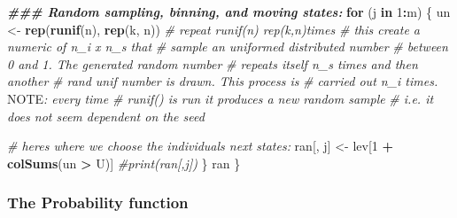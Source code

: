 \documentclass[
]{article}
\newenvironment{Shaded}{\begin{snugshade}}{\end{snugshade}}
\newcommand{\AlertTok}[1]{\textcolor[rgb]{0.94,0.16,0.16}{#1}}
\newcommand{\CommentTok}[1]{\textcolor[rgb]{0.56,0.35,0.01}{\textit{#1}}}
\newcommand{\ControlFlowTok}[1]{\textcolor[rgb]{0.13,0.29,0.53}{\textbf{#1}}}
\newcommand{\DecValTok}[1]{\textcolor[rgb]{0.00,0.00,0.81}{#1}}
\newcommand{\DocumentationTok}[1]{\textcolor[rgb]{0.56,0.35,0.01}{\textbf{\textit{#1}}}}
\newcommand{\FunctionTok}[1]{\textcolor[rgb]{0.13,0.29,0.53}{\textbf{#1}}}
\newcommand{\NormalTok}[1]{#1}
\newcommand{\OtherTok}[1]{\textcolor[rgb]{0.56,0.35,0.01}{#1}}
\newcommand{\SpecialCharTok}[1]{\textcolor[rgb]{0.81,0.36,0.00}{\textbf{#1}}}
\begin{document}
\begin{Shaded}
\begin{Highlighting}[]
  \DocumentationTok{\#\#\# Random sampling, binning, and moving states: }
  \ControlFlowTok{for}\NormalTok{ (j }\ControlFlowTok{in} \DecValTok{1}\SpecialCharTok{:}\NormalTok{m) \{}
\NormalTok{    un }\OtherTok{\textless{}{-}} \FunctionTok{rep}\NormalTok{(}\FunctionTok{runif}\NormalTok{(n), }\FunctionTok{rep}\NormalTok{(k, n)) }\CommentTok{\# repeat \textasciigrave{}runif(n)\textasciigrave{} \textasciigrave{}rep(k,n)\textasciigrave{}times}
                                   \CommentTok{\# this create a numeric of \textasciigrave{}n\_i x n\_s\textasciigrave{} that }
                                   \CommentTok{\# sample  an uniformed distributed number }
                                   \CommentTok{\# between 0 and 1. The generated random number}
                                   \CommentTok{\# repeats itself \textasciigrave{}n\_s\textasciigrave{} times and then another }
                                   \CommentTok{\# rand unif number is drawn. This process is }
                                   \CommentTok{\# carried out \textasciigrave{}n\_i\textasciigrave{} times. }\AlertTok{NOTE}\CommentTok{: every time}
                                   \CommentTok{\# runif() is run it produces a new random sample}
                                   \CommentTok{\# i.e. it does not seem dependent on the seed}
    
    \CommentTok{\# here\textquotesingle{}s where we choose the individuals\textquotesingle{} next states:}
\NormalTok{    ran[, j] }\OtherTok{\textless{}{-}}\NormalTok{ lev[}\DecValTok{1} \SpecialCharTok{+} \FunctionTok{colSums}\NormalTok{(un }\SpecialCharTok{\textgreater{}}\NormalTok{ U)]}
   \CommentTok{\#print(ran[,j]) }
\NormalTok{  \}}
\NormalTok{  ran}
\NormalTok{\}}
\end{Highlighting}
\end{Shaded}

\hypertarget{the-probability-function}{%
\subsubsection{The Probability
function}\label{the-probability-function}}
\end{document}
